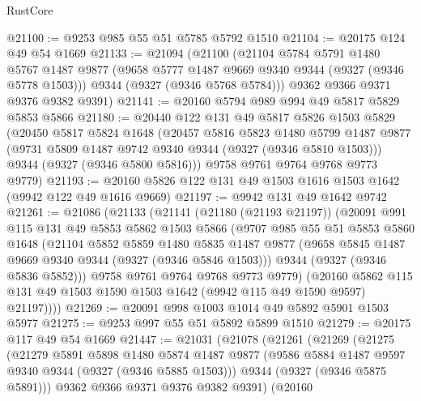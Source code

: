 \begin{lexlean}{RustCore}
\begin{coremodule}
@21100 := @9253 @985 @55 @51 @5785 @5792 @1510
@21104 := @20175 @124 @49 @54 @1669
@21133 := @21094
    (@21100
      (@21104
        @5784
        @5791
        @1480
        @5767
        @1487
        @9877
        (@9658 @5777 @1487 @9669 @9340 @9344 (@9327 (@9346 @5778 @1503)))
        @9344
        (@9327 (@9346 @5768 @5784)))
      @9362
      @9366
      @9371
      @9376
      @9382
      @9391)
@21141 := @20160 @5794 @989 @994 @49 @5817 @5829 @5853 @5866
@21180 := @20440
    @122
    @131
    @49
    @5817
    @5826
    @1503
    @5829
    (@20450
      @5817
      @5824
      @1648
      (@20457
        @5816
        @5823
        @1480
        @5799
        @1487
        @9877
        (@9731 @5809 @1487 @9742 @9340 @9344 (@9327 (@9346 @5810 @1503)))
        @9344
        (@9327 (@9346 @5800 @5816)))
      @9758
      @9761
      @9764
      @9768
      @9773
      @9779)
@21193 := @20160 @5826 @122 @131 @49 @1503 @1616 @1503 @1642 (@9942 @122 @49 @1616 @9669)
@21197 := @9942 @131 @49 @1642 @9742
@21261 := @21086
    (@21133
      (@21141
        (@21180 (@21193 @21197))
        (@20091
          @991
          @115
          @131
          @49
          @5853
          @5862
          @1503
          @5866
          (@9707
            @985
            @55
            @51
            @5853
            @5860
            @1648
            (@21104
              @5852
              @5859
              @1480
              @5835
              @1487
              @9877
              (@9658 @5845 @1487 @9669 @9340 @9344 (@9327 (@9346 @5846 @1503)))
              @9344
              (@9327 (@9346 @5836 @5852)))
            @9758
            @9761
            @9764
            @9768
            @9773
            @9779)
          (@20160
            @5862
            @115
            @131
            @49
            @1503
            @1590
            @1503
            @1642
            (@9942 @115 @49 @1590 @9597)
            @21197))))
@21269 := @20091 @998 @1003 @1014 @49 @5892 @5901 @1503 @5977
@21275 := @9253 @997 @55 @51 @5892 @5899 @1510
@21279 := @20175 @117 @49 @54 @1669
@21447 := @21031
    (@21078
      (@21261
        (@21269
          (@21275
            (@21279
              @5891
              @5898
              @1480
              @5874
              @1487
              @9877
              (@9586 @5884 @1487 @9597 @9340 @9344 (@9327 (@9346 @5885 @1503)))
              @9344
              (@9327 (@9346 @5875 @5891)))
            @9362
            @9366
            @9371
            @9376
            @9382
            @9391)
          (@20160

\end{coremodule}
\end{lexlean}
